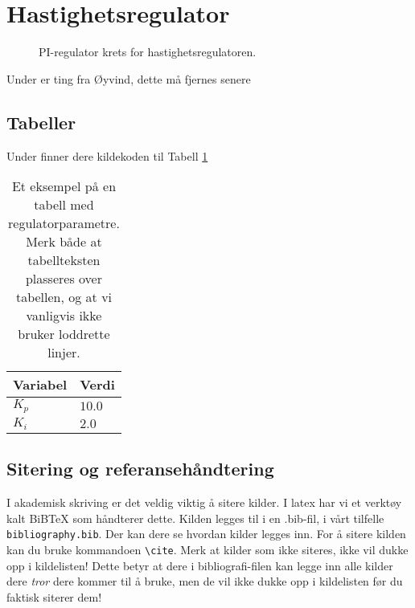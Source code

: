 \section{Hastighetsregulator}\label{sec:hastighetsreg}

\begin{figure}[t]
    \centering
    
    \caption{PI-regulator krets for hastighetsregulatoren.}
    \label{fig:krets_hastighets_regulator}
\end{figure}

Under er ting fra Øyvind, dette må fjernes senere

\subsection{Tabeller}
Under finner dere kildekoden til Tabell \ref{tab:eksempeltabell}


\begin{table}[tb]
	\centering
	\begin{tabular}{ll} 
		\toprule
		Variabel & Verdi \\
		\midrule
        $K_p$ & $10.0$ \\
        $K_i$ & $2.0$\\
		\bottomrule
	\end{tabular}
    \caption{Et eksempel på en tabell med regulatorparametre. Merk både at tabellteksten plasseres over tabellen, og at vi vanligvis ikke bruker loddrette linjer.}
\label{tab:eksempeltabell}
\end{table}

\subsection{Sitering og referansehåndtering}
I akademisk skriving er det veldig viktig å sitere kilder. I latex har vi et verktøy kalt BiBTeX som 
håndterer dette. Kilden legges til i en .bib-fil, i vårt tilfelle \texttt{bibliography.bib}. Der kan dere
se hvordan kilder legges inn. For å sitere kilden kan du bruke kommandoen \texttt{\textbackslash{cite}}.
Merk at kilder som ikke siteres, ikke vil dukke opp i kildelisten! Dette betyr at dere i bibliografi-filen kan
legge inn alle kilder dere \emph{tror} dere kommer til å bruke, men de vil ikke dukke opp i kildelisten før du
faktisk siterer dem!

